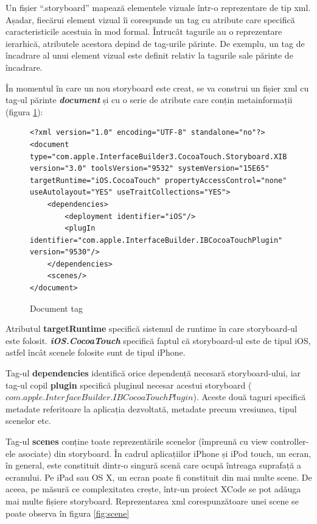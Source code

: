 Un fișier “.storyboard” mapează elementele vizuale într-o reprezentare de tip xml. Așadar, fiecărui element vizual îi corespunde un tag cu atribute care specifică caracteristicile acestuia în mod formal. Întrucât tagurile au o reprezentare ierarhică, atributele acestora depind de tag-urile părinte. De exemplu, un tag de încadrare al unui element vizual este definit relativ la tagurile sale părinte de încadrare.

În momentul în care un nou storyboard este creat, se va construi un fișier xml cu tag-ul părinte \textbf{\textit{document}} și cu o serie de atribute care conțin metainformații (figura \ref{fig:document}):

\begin{figure}[!htbp]
\lstset{language=XML}
\begin{lstlisting}
<?xml version="1.0" encoding="UTF-8" standalone="no"?>
<document type="com.apple.InterfaceBuilder3.CocoaTouch.Storyboard.XIB" version="3.0" toolsVersion="9532" systemVersion="15E65" targetRuntime="iOS.CocoaTouch" propertyAccessControl="none" useAutolayout="YES" useTraitCollections="YES">
    <dependencies>
        <deployment identifier="iOS"/>
        <plugIn identifier="com.apple.InterfaceBuilder.IBCocoaTouchPlugin" version="9530"/>
    </dependencies>
    <scenes/>
</document>
\end{lstlisting}
\caption{Document tag}\label{fig:document}
\end{figure}

Atributul \textbf{targetRuntime}  specifică sistemul de runtime în care storyboard-ul este folosit. \textbf{\textit{iOS.CocoaTouch}} specifică faptul că storyboard-ul este de tipul iOS, astfel încât scenele folosite sunt de tipul iPhone.

Tag-ul \textbf{dependencies} identifică orice dependență necesară storyboard-ului, iar tag-ul copil \textbf{plugin} specifică pluginul necesar acestui storyboard ($com.apple.InterfaceBuilder.IBCocoaTouchPlugin$). Aceste două taguri specifică metadate referitoare la aplicația dezvoltată, metadate precum vresiunea, tipul scenelor etc.

Tag-ul \textbf{scenes} conține toate reprezentările scenelor (împreună cu view controller-ele asociate) din storyboard. 
În cadrul aplicațiilor iPhone și iPod touch, un ecran, în general, este constituit dintr-o singură scenă care ocupă întreaga suprafață a ecranului. Pe iPad sau OS X, un ecran poate fi constituit din mai multe scene. De aceea, pe măsură ce complexitatea crește, într-un proiect XCode se pot adăuga mai multe fișiere storyboard.
Reprezentarea xml corespunzătoare unei scene se poate observa în figura \ref{fig:scene}

